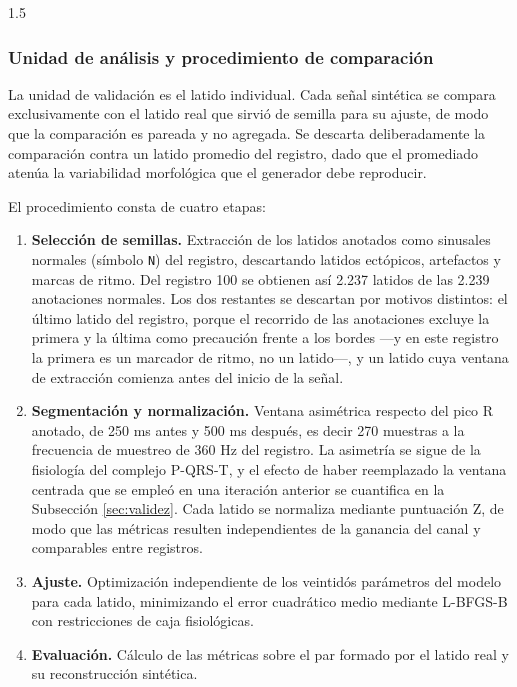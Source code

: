 \begin{spacing}{1.5}
\subsubsection{Unidad de análisis y procedimiento de comparación}\label{sec:unidad}

La unidad de validación es el latido individual. Cada señal sintética se compara exclusivamente con el latido real que sirvió de semilla para su ajuste, de modo que la comparación es pareada y no agregada. Se descarta deliberadamente la comparación contra un latido promedio del registro, dado que el promediado atenúa la variabilidad morfológica que el generador debe reproducir.

El procedimiento consta de cuatro etapas:

\begin{enumerate}
    \item \textbf{Selección de semillas.} Extracción de los latidos anotados como sinusales normales (símbolo \texttt{N}) del registro, descartando latidos ectópicos, artefactos y marcas de ritmo. Del registro 100 se obtienen así 2.237 latidos de las 2.239 anotaciones normales. Los dos restantes se descartan por motivos distintos: el último latido del registro, porque el recorrido de las anotaciones excluye la primera y la última como precaución frente a los bordes —y en este registro la primera es un marcador de ritmo, no un latido—, y un latido cuya ventana de extracción comienza antes del inicio de la señal.
    \item \textbf{Segmentación y normalización.} Ventana asimétrica respecto del pico R anotado, de 250 ms antes y 500 ms después, es decir 270 muestras a la frecuencia de muestreo de 360 Hz del registro. La asimetría se sigue de la fisiología del complejo P-QRS-T, y el efecto de haber reemplazado la ventana centrada que se empleó en una iteración anterior se cuantifica en la Subsección \ref{sec:validez}. Cada latido se normaliza mediante puntuación Z, de modo que las métricas resulten independientes de la ganancia del canal y comparables entre registros.
    \item \textbf{Ajuste.} Optimización independiente de los veintidós parámetros del modelo para cada latido, minimizando el error cuadrático medio mediante L-BFGS-B \cite{byrd1995limited} con restricciones de caja fisiológicas.
    \item \textbf{Evaluación.} Cálculo de las métricas sobre el par formado por el latido real y su reconstrucción sintética.
\end{enumerate}


\end{spacing}
